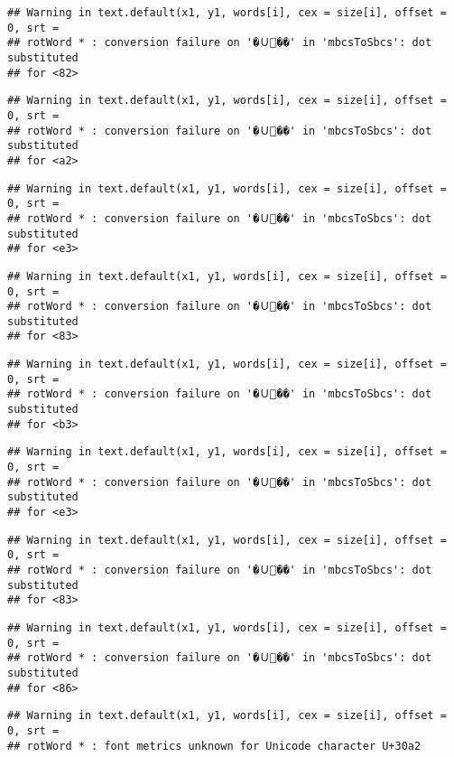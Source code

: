 \documentclass[]{article}
\begin{document}
\begin{verbatim}
## Warning in text.default(x1, y1, words[i], cex = size[i], offset = 0, srt =
## rotWord * : conversion failure on '�Ｕ��' in 'mbcsToSbcs': dot substituted
## for <82>
\end{verbatim}

\begin{verbatim}
## Warning in text.default(x1, y1, words[i], cex = size[i], offset = 0, srt =
## rotWord * : conversion failure on '�Ｕ��' in 'mbcsToSbcs': dot substituted
## for <a2>
\end{verbatim}

\begin{verbatim}
## Warning in text.default(x1, y1, words[i], cex = size[i], offset = 0, srt =
## rotWord * : conversion failure on '�Ｕ��' in 'mbcsToSbcs': dot substituted
## for <e3>
\end{verbatim}

\begin{verbatim}
## Warning in text.default(x1, y1, words[i], cex = size[i], offset = 0, srt =
## rotWord * : conversion failure on '�Ｕ��' in 'mbcsToSbcs': dot substituted
## for <83>
\end{verbatim}

\begin{verbatim}
## Warning in text.default(x1, y1, words[i], cex = size[i], offset = 0, srt =
## rotWord * : conversion failure on '�Ｕ��' in 'mbcsToSbcs': dot substituted
## for <b3>
\end{verbatim}

\begin{verbatim}
## Warning in text.default(x1, y1, words[i], cex = size[i], offset = 0, srt =
## rotWord * : conversion failure on '�Ｕ��' in 'mbcsToSbcs': dot substituted
## for <e3>
\end{verbatim}

\begin{verbatim}
## Warning in text.default(x1, y1, words[i], cex = size[i], offset = 0, srt =
## rotWord * : conversion failure on '�Ｕ��' in 'mbcsToSbcs': dot substituted
## for <83>
\end{verbatim}

\begin{verbatim}
## Warning in text.default(x1, y1, words[i], cex = size[i], offset = 0, srt =
## rotWord * : conversion failure on '�Ｕ��' in 'mbcsToSbcs': dot substituted
## for <86>
\end{verbatim}

\begin{verbatim}
## Warning in text.default(x1, y1, words[i], cex = size[i], offset = 0, srt =
## rotWord * : font metrics unknown for Unicode character U+30a2
\end{verbatim}
\end{document}
